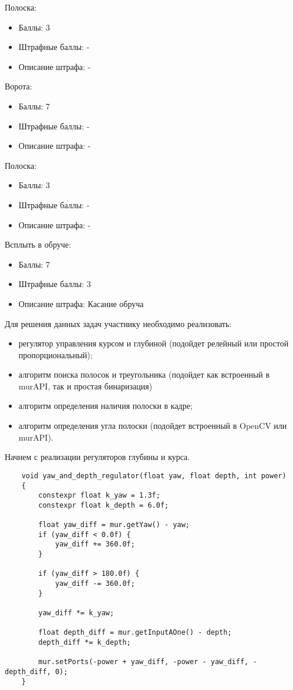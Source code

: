 \markSection

Полоска: 
\begin{itemize}
    \item Баллы: 3
    \item Штрафные баллы: -
    \item Описание штрафа: -
\end{itemize}

Ворота:
\begin{itemize}
    \item Баллы: 7
    \item Штрафные баллы: -
    \item Описание штрафа: -
\end{itemize}

Полоска: 
\begin{itemize}
    \item Баллы: 3
    \item Штрафные баллы: -
    \item Описание штрафа: -
\end{itemize}

Всплыть в обруче:
\begin{itemize}
    \item Баллы: 7
    \item Штрафные баллы: 3
    \item Описание штрафа: Касание обруча
\end{itemize}

\solutionSection

Для решения данных задач участнику необходимо реализовать:

\begin{itemize}
    \item регулятор управления курсом и глубиной (подойдет релейный или простой пропорциональный);
    \item алгоритм поиска полосок и треугольника (подойдет как встроенный в murAPI, так и простая бинаризация)  
    \item алгоритм определения наличия полоски в кадре;
    \item алгоритм определения угла полоски (подойдет встроенный в OpenCV или murAPI).
\end{itemize}

Начнем с реализации регуляторов глубины и курса. 

\begin{verbatim}
    void yaw_and_depth_regulator(float yaw, float depth, int power)
    {
        constexpr float k_yaw = 1.3f;
        constexpr float k_depth = 6.0f;

        float yaw_diff = mur.getYaw() - yaw;
        if (yaw_diff < 0.0f) {
            yaw_diff += 360.0f;
        }

        if (yaw_diff > 180.0f) {
            yaw_diff -= 360.0f;
        }

        yaw_diff *= k_yaw;

        float depth_diff = mur.getInputAOne() - depth;
        depth_diff *= k_depth;

        mur.setPorts(-power + yaw_diff, -power - yaw_diff, -depth_diff, 0);
    }
\end{verbatim}

